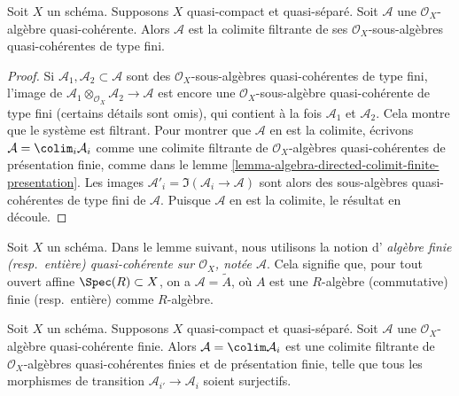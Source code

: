 \begin{lemma}
\label{lemma-algebra-directed-colimit-finite-type}
Soit $X$ un schéma. Supposons $X$ quasi-compact et quasi-séparé.
Soit $\mathcal{A}$ une $\mathcal{O}_X$-algèbre
quasi-cohérente. Alors $\mathcal{A}$ est la colimite
filtrante de ses $\mathcal{O}_X$-sous-algèbres quasi-cohérentes de type fini.
\end{lemma}

\begin{proof}
Si $\mathcal{A}_1, \mathcal{A}_2 \subset \mathcal{A}$ sont
des $\mathcal{O}_X$-sous-algèbres quasi-cohérentes de type fini, l'image de
$\mathcal{A}_1 \otimes_{\mathcal{O}_X} \mathcal{A}_2 \to \mathcal{A}$
est encore une $\mathcal{O}_X$-sous-algèbre quasi-cohérente de
type fini (certains détails sont omis), qui contient à la fois $\mathcal{A}_1$ et $\mathcal{A}_2$.
Cela montre que le système est filtrant. Pour
montrer que $\mathcal{A}$ en est la colimite, écrivons
$\mathcal{A} = \colim_i \mathcal{A}_i$ comme
une colimite filtrante de $\mathcal{O}_X$-algèbres quasi-cohérentes de présentation finie,
comme dans le lemme \ref{lemma-algebra-directed-colimit-finite-presentation}.
Les images $\mathcal{A}'_i = \Im(\mathcal{A}_i \to \mathcal{A})$ sont
alors des sous-algèbres quasi-cohérentes de type fini de $\mathcal{A}$. Puisque
$\mathcal{A}$ en est la colimite, le résultat en découle.
\end{proof}

\noindent
Soit $X$ un schéma. Dans le lemme suivant, nous utilisons la
notion d' {\it algèbre finie (resp.\ entière) quasi-cohérente sur
$\mathcal{O}_X$, notée $\mathcal{A}$}. Cela signifie que, pour tout
ouvert affine $\Spec(R) \subset X$, on a
$\mathcal{A} = \widetilde{A}$, où $A$ est une $R$-algèbre
(commutative) finie (resp.\ entière) comme $R$-algèbre.

\begin{lemma}
\label{lemma-finite-algebra-directed-colimit-finite-finitely-presented}
Soit $X$ un schéma. Supposons $X$ quasi-compact et quasi-séparé.
Soit $\mathcal{A}$ une $\mathcal{O}_X$-algèbre quasi-cohérente
finie. Alors $\mathcal{A} = \colim \mathcal{A}_i$ est une
colimite filtrante de $\mathcal{O}_X$-algèbres
quasi-cohérentes finies et de présentation finie, telle que tous les morphismes de transition $\mathcal{A}_{i'} \to \mathcal{A}_i$
soient surjectifs.
\end{lemma}


